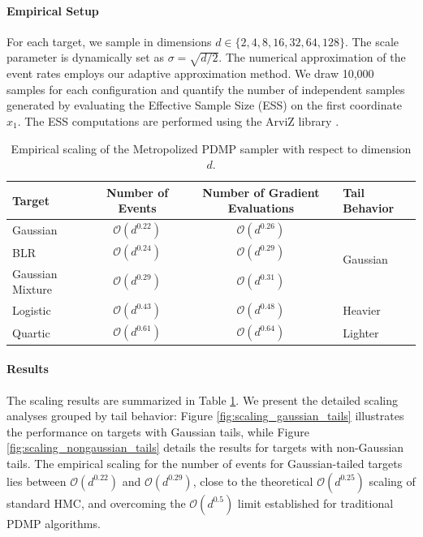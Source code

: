 \documentclass{article}
\begin{document}
\paragraph{Empirical Setup}
For each target, we sample in dimensions $d \in \{2, 4, 8, 16, 32, 64, 128\}$. The scale parameter is dynamically set as $\sigma = \sqrt{d/2}$. The numerical approximation of the event rates employs our adaptive approximation method. We draw 10,000 samples for each configuration and quantify the number of independent samples generated by evaluating the Effective Sample Size (ESS) on the first coordinate $x_1$. The ESS computations are performed using the ArviZ library \cite{Martin2026}.


\begin{table}[htbp]
    \centering
    \begin{tabular}{lccl}
        \hline
        \textbf{Target} & \textbf{Number of Events} & \textbf{Number of Gradient Evaluations} & \textbf{Tail Behavior} \\
        \hline
        Gaussian & $\mathcal{O}(d^{0.22})$ & $\mathcal{O}(d^{0.26})$ & \multirow{3}{*}{Gaussian} \\
        BLR & $\mathcal{O}(d^{0.24})$ & $\mathcal{O}(d^{0.29})$ & \\
        Gaussian Mixture & $\mathcal{O}(d^{0.29})$ & $\mathcal{O}(d^{0.31})$ & \\
        \hline
        Logistic & $\mathcal{O}(d^{0.43})$ & $\mathcal{O}(d^{0.48})$ & Heavier \\
        Quartic & $\mathcal{O}(d^{0.61})$ & $\mathcal{O}(d^{0.64})$ & Lighter \\
        \hline
    \end{tabular}
    \caption{Empirical scaling of the Metropolized PDMP sampler with respect to dimension $d$.}
    \label{tab:empirical_scaling}
\end{table}


\paragraph{Results}
The scaling results are summarized in Table \ref{tab:empirical_scaling}. We present the detailed scaling analyses grouped by tail behavior: Figure \ref{fig:scaling_gaussian_tails} illustrates the performance on targets with Gaussian tails, while Figure \ref{fig:scaling_nongaussian_tails} details the results for targets with non-Gaussian tails. The empirical scaling for the number of events for Gaussian-tailed targets lies between $\mathcal{O}(d^{0.22})$ and $\mathcal{O}(d^{0.29})$, close to the theoretical $\mathcal{O}(d^{0.25})$ scaling of standard HMC, and overcoming the $\mathcal{O}(d^{0.5})$ limit established for traditional PDMP algorithms.
\end{document}
